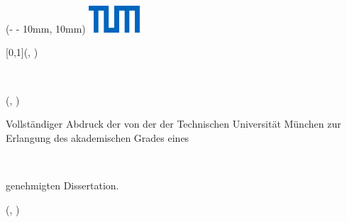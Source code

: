 \begin{titlepage}
    \begin{textblock*}{\TUMLogoWidth}(\paperwidth - \TUMLogoWidth - 10mm, 10mm)
        \noindent \includegraphics[height = 10mm]{frontmatter/images/TUM_Logo_blau_rgb_s.eps}
    \end{textblock*}



    \begin{textblock*}{}[0,1](, \titlevpos)
        \centering

        {\bfseries \Large \textcolor{TUMBlue} \thesistitle{}}

        \vspace{10mm}

        {\bfseries \large \fullname{}}\\

    \end{textblock*}



    \begin{textblock*}{}(, \informationvpos)
        \centering
        \raggedright

        Vollst\"andiger Abdruck der von der {\facultyger{}} der Technischen
        Universit\"at M\"unchen zur Erlangung des akademischen Grades eines\\

        \vspace{6mm}

        \centering {\bfseries \large {\degree{}}}\\

        \vspace{6mm}
        \raggedright

        genehmigten Dissertation.\\

    \end{textblock*}



    \begin{textblock*}{}(, \examinervpos)
        \centering
        \raggedright


\end{textblock*}
\end{titlepage}
